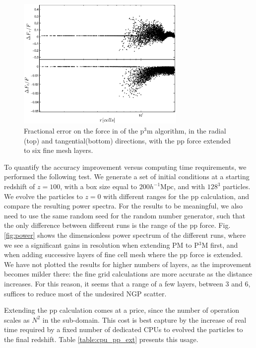  
\begin{figure}%
  \begin{center}
    \includegraphics[width=3.2in]{graphs/densityForce_fracErr_ppext=6.eps}
  \caption{Fractional error on the force in of the p$^3$m algorithm, in the radial (top) and tangential(bottom) directions,
  with the pp force extended to six fine mesh layers.
    \label{fig:den_force_fracErr_ppext6}}
\end{center}
\end{figure}

 
 
 To quantify the accuracy improvement versus computing time requirements, we performed the following test.
 We generate a set of initial conditions at a starting redshift of $z = 100$, with a box size equal to $ 200 h^{-1}\mbox{Mpc}$,
 and with $128^{3}$ particles. We evolve the particles to $z=0$ with different ranges for the pp calculation, and compare 
 the resulting power spectra. For the results to be meaningful, we also need to use the same random seed for the random number generator,
 such that the only difference between different runs is the range of the pp force.
 Fig. \ref{fig:power} shows the dimensionless power spectrum of the different runs, where we see a significant gains in resolution
 when extending  PM to P$^{3}$M first, and when adding successive layers of fine cell mesh where the pp force is extended.
We have not plotted the results for higher numbers of layers, as the improvement becomes milder there: the fine grid calculations
are more accurate as the distance increases. For this reason, it seems that a range of a few layers, between 3 and 6, suffices 
to reduce most of the undesired NGP scatter.

Extending the pp calculation comes at a price, since the number of operation scales as  $N^{2}$ in the sub-domain. 
This cost is best capture by the increase of real time required by a fixed number of dedicated  {\small CPU}s 
to evolved the particles to the final redshift. Table \ref{table:cpu_pp_ext} presents this usage.


